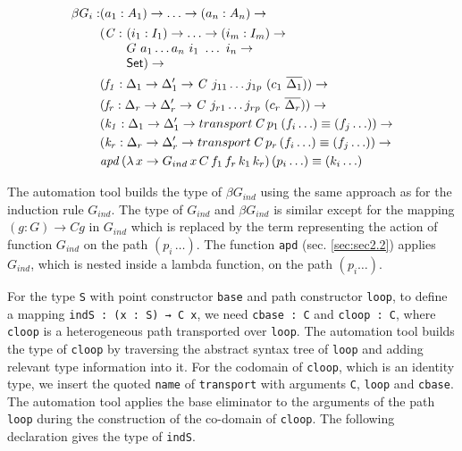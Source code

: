 \documentclass[sigplan,10pt]{acmart}
\begin{document}
\begin{align*}
\beta G_i : & (a_1 : A_1) \to \ldots \to (a_n : A_n) \to\\
& \begin{array}{@{}l@{}l}(\mathit{C} :\ & (i_1 : I_1) \to \ldots \to (i_m : I_m) \to\\  & G\ a_1 \ldots a_n\ i_1\ \ldots\ i_n \to\\ &\SET{})\to\end{array} \\
& (\mathit{f_1} : \Delta_1 \to  \Delta_1^\prime \to \mathit{C}\ j_{11} \ldots j_{1p}\ (c_1\ \overline{\Delta_1})) \to \\
& (\mathit{f_r} : \Delta_r \to  \Delta_r^\prime \to \mathit{C}\ j_{r1} \ldots j_{rp}\ (c_r\ \overline{\Delta_r})) \to \\
& (\mathit{k_1} : \Delta_1 \to  \Delta_1^\prime \to transport \, \mathit{C} \, p_1 \, (f_i \ldots) \equiv (f_j \ldots)) \to \\
& (\mathit{k_r} : \Delta_r \to  \Delta_r^\prime \to transport \, \mathit{C} \, p_r \, (f_i \ldots) \equiv (f_j \ldots)) \to \\
& \mathit{apd} \, (\lambda \, x \to G_{ind} \, x \, C \, f_1 \, f_r \, k_1 \, k_r) \, (p_i \ldots) \equiv (k_i \ldots)
\end{align*}

The automation tool builds the type of $\beta G_{ind}$ using the same approach as for the induction rule $G_{ind}$. The type of $G_{ind}$ and $\beta G_{ind}$ is similar except for the mapping $(g : G) \to C g$ in $G_{ind}$ which is replaced by the term representing the action of function $G_{ind}$ on the path $(p_i \, \ldots)$. The function {\tt apd} (sec. \ref{sec:sec2.2}) applies $G_{ind}$, which is nested inside a lambda function, on the path $(p_i \ldots)$.

For the type {\tt S} with point constructor {\tt base} and path constructor {\tt loop}, to define a mapping {\tt indS : (x : S) → C x}, we need {\tt cbase : C} and {\tt cloop : C}, where {\tt cloop} is a heterogeneous path transported over {\tt loop}. The automation tool builds the type of {\tt cloop} by traversing the abstract syntax tree of {\tt loop} and adding relevant type information into it. For the codomain of {\tt cloop}, which is an identity type, we insert the quoted {\tt name} of {\tt transport} with arguments {\tt C}, {\tt loop} and {\tt cbase}. The automation tool applies the base eliminator to the arguments of the path {\tt loop} during the construction of the co-domain of {\tt cloop}. The following declaration gives the type of {\tt indS}.
\end{document}
